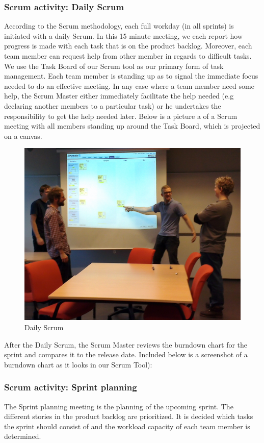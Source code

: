 \subsubsection{Scrum activity: Daily Scrum}
According to the Scrum methodology, each full workday (in all sprints) is initiated with a daily Scrum. In this 15 minute meeting, we each report how progress is made with each task that is on the product backlog. Moreover, each team member can request help from other member in regards to difficult tasks. We use the Task Board of our Scrum tool as our primary form of task management. Each team member is standing up as to signal the immediate focus needed to do an effective meeting. In any case where a team member need some help, the Scrum Master either immediately facilitate the help needed (e.g declaring another members to a particular task) or he undertakes the responsibility to get the help needed later. Below is a picture a of a Scrum meeting with all members standing up around the Task Board, which is projected on a canvas.
\begin{figure}[H]
  \includegraphics[width=\textwidth,natwidth=1696,natheight=1349]{illustrations/Daily.jpg}
  \caption{Daily Scrum}
  \label{dailyscrum}
\end{figure}
After the Daily Scrum, the Scrum Master reviews the burndown chart for the sprint and compares it to the release date. Included below is a screenshot of a burndown chart as it looks in our Scrum Tool):


\subsubsection{Scrum activity: Sprint planning}
The Sprint planning meeting is the planning of the upcoming sprint. The different stories in the product backlog are prioritized. It is decided which tasks the sprint should consist of and the workload capacity of each team member is determined.

